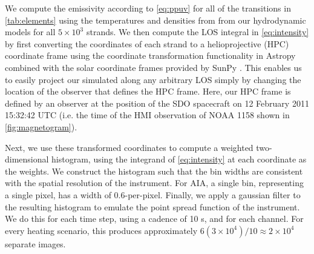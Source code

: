 We compute the emissivity according to \autoref{eq:ppuv} for all of the transitions in \autoref{tab:elements} using the temperatures and densities from from our hydrodynamic models for all $5\times10^3$ strands. We then compute the LOS integral in \autoref{eq:intensity} by first converting the coordinates of each strand to a helioprojective (HPC) coordinate frame \citep[see][]{thompson_coordinate_2006} using the coordinate transformation functionality in Astropy \citep{the_astropy_collaboration_astropy_2018} combined with the solar coordinate frames provided by SunPy \citep{sunpy_community_sunpypython_2015}. This enables us to easily project our simulated \AR{} along any arbitrary LOS simply by changing the location of the observer that defines the HPC frame. Here, our HPC frame is defined by an observer at the position of the SDO spacecraft on 12 February 2011 15:32:42 UTC (i.e. the time of the HMI observation of NOAA 1158 shown in \autoref{fig:magnetogram}).

Next, we use these transformed coordinates to compute a weighted two-dimensional histogram, using the integrand of \autoref{eq:intensity} at each coordinate as the weights. We construct the histogram such that the bin widths are consistent with the spatial resolution of the instrument. For AIA, a single bin, representing a single pixel, has a width of 0.6\arcsec-per-pixel. Finally, we  apply a gaussian filter to the resulting histogram to emulate the point spread function of the instrument. We do this for each time step, using a cadence of 10 s, and for each channel. For every heating scenario, this produces approximately $6(3\times10^4)/10\approx2\times10^4$ separate images.
